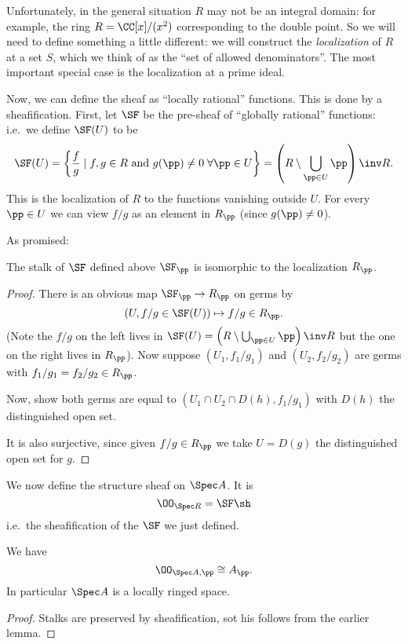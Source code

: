 Unfortunately, in the general situation $R$ may not be an integral domain:
for example, the ring $R = \CC[x] / (x^2)$ corresponding to the double point.
So we will need to define something a little different:
we will construct the \emph{localization} of $R$ at a set $S$,
which we think of as the ``set of allowed denominators''.
The most important special case is the localization at a prime ideal.

Now, we can define the sheaf as ``locally rational'' functions.
This is done by a sheafification.
First, let $\SF$ be the pre-sheaf of ``globally rational'' functions:
i.e.\ we define $\SF(U)$ to be
\[
	\SF(U) = \left\{
		\frac fg \mid f, g \in R
		\text{ and } g(\pp) \neq 0 \; \forall \pp \in U
	\right\}
	= \left(R \setminus \bigcup_{\pp \in U} \pp \right)\inv R.
\]
This is the localization of $R$ to the functions vanishing outside $U$.
For every $\pp \in U$ we can view $f/g$ as an element in $R_\pp$
(since $g(\pp) \ne 0$).

As promised:
\begin{lemma}
	\label{lem:global_rational_stalk}
	The stalk of $\SF$ defined above $\SF_\pp$ is isomorphic to
	the localization $R_\pp$.
\end{lemma}
\begin{proof}
	There is an obvious map $\SF_\pp \to R_\pp$ on germs by
	\[
		\left(U, f/g \in \SF(U) \right)
		\mapsto f/g \in R_\pp . \]
	(Note the $f/g$ on the left lives in
	$\SF(U) = \left(R \setminus \bigcup_{\pp \in U} \pp \right)\inv R$
	but the one on the right lives in $R_\pp$).
	Now suppose $(U_1, f_1 / g_1)$ and $(U_2, f_2 / g_2)$
	are germs with $f_1/g_1 = f_2/g_2 \in R_\pp$.
	\begin{exercise}
		Now, show both germs are equal to $(U_1 \cap U_2 \cap D(h), f_1 / g_1)$
		with $D(h)$ the distinguished open set.
	\end{exercise}
	It is also surjective, since given $f/g \in R_\pp$ we take $U = D(g)$
	the distinguished open set for $g$.
\end{proof}

\begin{definition}
	We now define the structure sheaf on $\Spec A$.
	It is
	\[ \OO_{\Spec R} = \SF\sh \]
	i.e.\ the sheafification of the $\SF$ we just defined.
\end{definition}
\begin{theorem}
	We have \[ \OO_{\Spec A, \pp} \cong A_\pp. \]
	In particular $\Spec A$ is a locally ringed space.
\end{theorem}
\begin{proof}
	Stalks are preserved by sheafification,
	sot his follows from the earlier lemma.
\end{proof}

